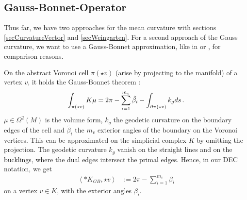  \subsection{Gauss-Bonnet-Operator}
    Thus far, we have two approaches for the mean curvature with sections \ref{secCurvatureVector} and \ref{secWeingarten}.
    For a second approach of the Gauss curvature, we want to use a Gauss-Bonnet approximation, like in \cite{polthier} or \cite{octavian}, for comparison reasons.
    
    On the abstract Voronoi cell \( \pi(\star v) \) (arise by projecting to the manifold) of a vertex \( v \), 
    it holds the Gauss-Bonnet theorem \cite{berger}:
    \begin{align}
      \label{eqGaussBonnet}
      \int_{\pi(\star v)}K \mu = 2\pi - \sum_{i=1}^{m_{v}}\tilde{\beta_{i}} - \int_{\partial\pi(\star v)} k_{g} ds \,\text{.}
    \end{align}
    \( \mu\in\Omega^{2}(M)  \) is the volume form, \( k_{g} \) the geodetic curvature on the boundary edges of the cell 
    and \( \tilde{\beta_{i}} \) the \( m_{v} \) exterior angles of the boundary on the Voronoi vertices.
    This can be approximated on the simplicial complex \( K \) by omitting the projection.
    The geodetic curvature \( k_{g} \) vanish on the straight lines and on the bucklings, where the dual edges intersect the primal edges.
    Hence, in our DEC notation, we get
    \begin{align}
      \label{eqDisGaussBonnet}
      \left\langle *K_{GB} , \star v \right\rangle &:= 2\pi - \sum_{i=1}^{m_{v}}\beta_{i}
    \end{align}
    on a vertex \( v\in K \), with the exterior angles \( \beta_{i} \).
